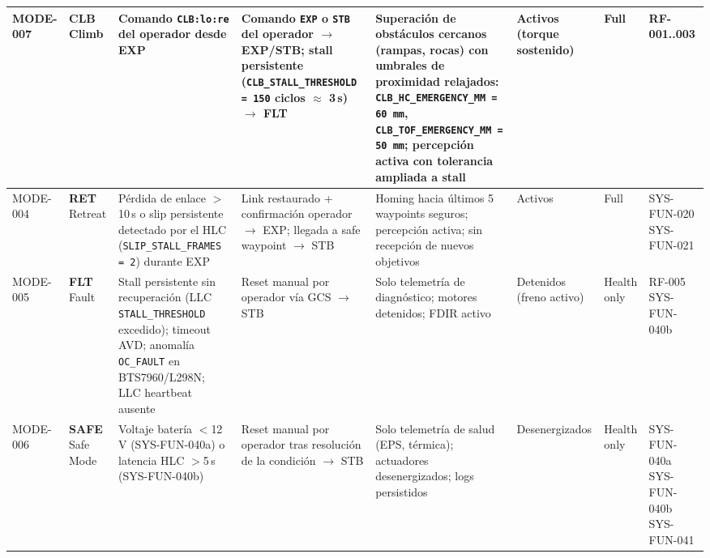 \begin{landscape}
\begin{longtable}{| l | l | p{3.0cm} | p{2.8cm} | p{3.0cm} | p{2.5cm} | p{1.6cm} | p{2.5cm} |}
MODE-007 & \textbf{CLB} \newline Climb &
Comando \texttt{CLB:lo:re} del operador desde EXP &
Comando \texttt{EXP} o \texttt{STB} del operador $\rightarrow$ EXP/STB; stall persistente (\texttt{CLB\_STALL\_THRESHOLD = 150} ciclos $\approx$ 3\,s) $\rightarrow$ FLT &
Superación de obstáculos cercanos (rampas, rocas) con umbrales de proximidad relajados: \texttt{CLB\_HC\_EMERGENCY\_MM = 60\,mm}, \texttt{CLB\_TOF\_EMERGENCY\_MM = 50\,mm}; percepción activa con tolerancia ampliada a stall &
Activos \newline (torque sostenido) &
Full &
RF-001..003 \\ \hline

MODE-004 & \textbf{RET} \newline Retreat &
Pérdida de enlace $>$10\,s o slip persistente detectado por el HLC (\texttt{SLIP\_STALL\_FRAMES = 2}) durante EXP &
Link restaurado + confirmación operador $\rightarrow$ EXP; llegada a safe waypoint $\rightarrow$ STB &
Homing hacia últimos 5 waypoints seguros; percepción activa; sin recepción de nuevos objetivos &
Activos &
Full &
SYS-FUN-020 \newline SYS-FUN-021 \\ \hline

MODE-005 & \textbf{FLT} \newline Fault &
Stall persistente sin recuperación (LLC \texttt{STALL\_THRESHOLD} excedido); timeout AVD; anomalía \texttt{OC\_FAULT} en BTS7960/L298N; LLC heartbeat ausente &
Reset manual por operador vía GCS $\rightarrow$ STB &
Solo telemetría de diagnóstico; motores detenidos; FDIR activo &
Detenidos \newline (freno activo) &
Health only &
RF-005 \newline SYS-FUN-040b \\ \hline

MODE-006 & \textbf{SAFE} \newline Safe Mode &
Voltaje batería $<$12\,V (SYS-FUN-040a) o latencia HLC $>$5\,s (SYS-FUN-040b) &
Reset manual por operador tras resolución de la condición $\rightarrow$ STB &
Solo telemetría de salud (EPS, térmica); actuadores desenergizados; logs persistidos &
Desenergizados &
Health only &
SYS-FUN-040a \newline SYS-FUN-040b \newline SYS-FUN-041 \\ \hline

\end{longtable}
\end{landscape}

